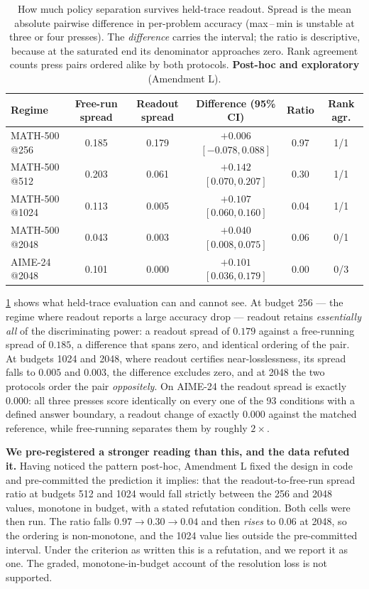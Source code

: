 \documentclass{article}
\begin{document}
\begin{table}[t]\centering
\caption{How much policy separation survives held-trace readout. Spread is the mean absolute pairwise difference in per-problem accuracy (max\,--\,min is unstable at three or four presses). The \emph{difference} carries the interval; the ratio is descriptive, because at the saturated end its denominator approaches zero. Rank agreement counts press pairs ordered alike by both protocols. \textbf{Post-hoc and exploratory} (Amendment L).}\label{tab:resolution}\footnotesize
\begin{tabular}{lccccc}
\toprule
Regime & Free-run spread & Readout spread & Difference (95\% CI) & Ratio & Rank agr. \\
\midrule
MATH-500 @256  & 0.185 & 0.179 & $+0.006$ $[-0.078, 0.088]$ & 0.97 & 1/1 \\
MATH-500 @512  & 0.203 & 0.061 & $+0.142$ $[0.070, 0.207]$ & 0.30 & 1/1 \\
MATH-500 @1024 & 0.113 & 0.005 & $+0.107$ $[0.060, 0.160]$ & 0.04 & 1/1 \\
MATH-500 @2048 & 0.043 & 0.003 & $+0.040$ $[0.008, 0.075]$ & 0.06 & 0/1 \\
\midrule
AIME-24 @2048  & 0.101 & 0.000 & $+0.101$ $[0.036, 0.179]$ & 0.00 & 0/3 \\
\bottomrule
\end{tabular}
\end{table}

\cref{tab:resolution} shows what held-trace evaluation can and cannot see. At budget 256 --- the regime where readout reports a large accuracy drop --- readout retains \emph{essentially all} of the discriminating power: a readout spread of $0.179$ against a free-running spread of $0.185$, a difference that spans zero, and identical ordering of the pair. At budgets 1024 and 2048, where readout certifies near-losslessness, its spread falls to $0.005$ and $0.003$, the difference excludes zero, and at 2048 the two protocols order the pair \emph{oppositely}. On AIME-24 the readout spread is exactly $0.000$: all three presses score identically on every one of the 93 conditions with a defined answer boundary, a readout change of exactly $0.000$ against the matched reference, while free-running separates them by roughly $2\times$.

\textbf{We pre-registered a stronger reading than this, and the data refuted it.} Having noticed the pattern post-hoc, Amendment L fixed the design in code and pre-committed the prediction it implies: that the readout-to-free-run spread ratio at budgets 512 and 1024 would fall strictly between the 256 and 2048 values, monotone in budget, with a stated refutation condition. Both cells were then run. The ratio falls $0.97 \to 0.30 \to 0.04$ and then \emph{rises} to $0.06$ at 2048, so the ordering is non-monotone, and the 1024 value lies outside the pre-committed interval. Under the criterion as written this is a refutation, and we report it as one. The graded, monotone-in-budget account of the resolution loss is not supported.
\end{document}
